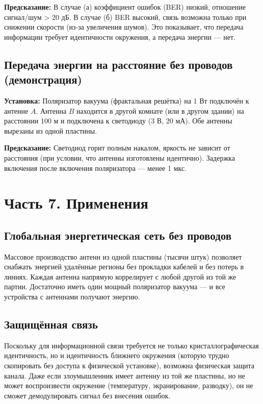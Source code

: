 \documentclass[a4paper,12pt]{article}
\begin{document}
\textbf{Предсказание:} В случае (а) коэффициент ошибок (BER) низкий, отношение сигнал/шум > 20 дБ. В случае (б) BER высокий, связь возможна только при снижении скорости (из-за увеличения шумов). Это показывает, что передача информации требует идентичности окружения, а передача энергии — нет.

\subsection{Передача энергии на расстояние без проводов (демонстрация)}
\textbf{Установка:} Поляризатор вакуума (фрактальная решётка) на 1 Вт подключён к антенне \(A\). Антенна \(B\) находится в другой комнате (или в другом здании) на расстоянии 100 м и подключена к светодиоду (3 В, 20 мА). Обе антенны вырезаны из одной пластины.

\textbf{Предсказание:} Светодиод горит полным накалом, яркость не зависит от расстояния (при условии, что антенны изготовлены идентично). Задержка включения после включения поляризатора — менее 1 мкс.

\section*{Часть 7. Применения}

\subsection{Глобальная энергетическая сеть без проводов}
Массовое производство антенн из одной пластины (тысячи штук) позволяет снабжать энергией удалённые регионы без прокладки кабелей и без потерь в линиях. Каждая антенна напрямую коррелирует с любой другой из той же партии. Достаточно иметь один мощный поляризатор вакуума — и все устройства с антеннами получают энергию.

\subsection{Защищённая связь}
Поскольку для информационной связи требуется не только кристаллографическая идентичность, но и идентичность ближнего окружения (которую трудно скопировать без доступа к физической установке), возможна физическая защита канала. Даже если злоумышленник имеет антенну из той же пластины, но не может воспроизвести окружение (температуру, экранирование, разводку), он не сможет демодулировать сигнал без внесения ошибок.
\end{document}
